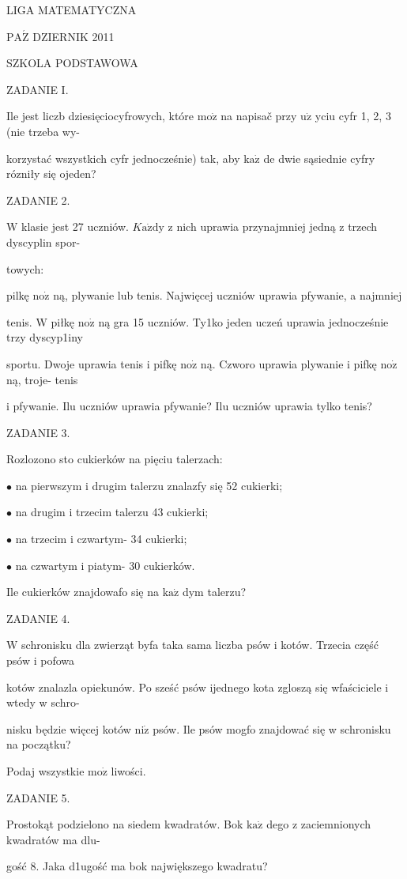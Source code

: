 \documentclass[a4paper,12pt]{article}
\begin{document}
LIGA MATEMATYCZNA

$\mathrm{P}\mathrm{A}\acute{\mathrm{Z}}$ DZIERNIK 2011

SZKOLA PODSTAWOWA

ZADANIE I.

Ile jest liczb dziesięciocyfrowych, które $\mathrm{m}\mathrm{o}\dot{\mathrm{z}}$ na napisač przy $\mathrm{u}\dot{\mathrm{z}}$ yciu cyfr 1, 2, 3 (nie trzeba wy-

korzystać wszystkich cyfr jednocześnie) tak, aby $\mathrm{k}\mathrm{a}\dot{\mathrm{z}}$ de dwie sąsiednie cyfry rózniły się ojeden?

ZADANIE 2.

$\mathrm{W}$ klasie jest 27 uczniów. $K\mathrm{a}\dot{\mathrm{z}}\mathrm{d}\mathrm{y}$ z nich uprawia przynajmniej jedną z trzech dyscyplin spor-

towych:

pilkę $\mathrm{n}\mathrm{o}\dot{\mathrm{z}}$ ną, plywanie lub tenis. Najwięcej uczniów uprawia pfywanie, a najmniej

tenis. $\mathrm{W}$ piłkę $\mathrm{n}\mathrm{o}\dot{\mathrm{z}}$ ną gra 15 uczniów. Ty1ko jeden uczeń uprawia jednocześnie trzy dyscyp1iny

sportu. Dwoje uprawia tenis i pifkę $\mathrm{n}\mathrm{o}\dot{\mathrm{z}}$ ną. Czworo uprawia plywanie i pifkę $\mathrm{n}\mathrm{o}\dot{\mathrm{z}}$ ną, troje- tenis

i pfywanie. Ilu uczniów uprawia pfywanie? Ilu uczniów uprawia tylko tenis?

ZADANIE 3.

Rozlozono sto cukierków na pięciu talerzach:

$\bullet$ na pierwszym i drugim talerzu znalazfy się 52 cukierki;

$\bullet$ na drugim i trzecim talerzu 43 cukierki;

$\bullet$ na trzecim i czwartym- 34 cukierki;

$\bullet$ na czwartym i piatym- 30 cukierków.

Ile cukierków znajdowafo się na $\mathrm{k}\mathrm{a}\dot{\mathrm{z}}$ dym talerzu?

ZADANIE 4.

$\mathrm{W}$ schronisku dla zwierząt byfa taka sama liczba psów i kotów. Trzecia część psów i pofowa

kotów znalazla opiekunów. Po sześć psów ijednego kota zgloszą się wfaściciele i wtedy w schro-

nisku będzie więcej kotów $\mathrm{n}\mathrm{i}\dot{\mathrm{z}}$ psów. Ile psów mogfo znajdować się w schronisku na początku?

Podaj wszystkie $\mathrm{m}\mathrm{o}\dot{\mathrm{z}}$ liwości.

ZADANIE 5.

Prostokąt podzielono na siedem kwadratów. Bok $\mathrm{k}\mathrm{a}\dot{\mathrm{z}}$ dego z zaciemnionych kwadratów ma dlu-

gość 8. Jaka d1ugość ma bok największego kwadratu?
\end{document}
